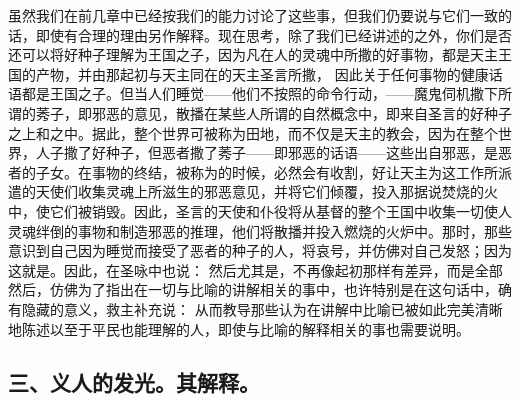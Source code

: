  虽然我们在前几章中已经按我们的能力讨论了这些事，但我们仍要说与它们一致的话，即使有合理的理由另作解释。现在思考，除了我们已经讲述的之外，你们是否还可以将好种子理解为王国之子，因为凡在人的灵魂中所撒的好事物，都是天主王国的产物，并由那起初与天主同在的天主圣言所撒， 因此关于任何事物的健康话语都是王国之子。但当人们睡觉——他们不按照的命令行动，——魔鬼伺机撒下所谓的莠子，即邪恶的意见，散播在某些人所谓的自然概念中，即来自圣言的好种子之上和之中。据此，整个世界可被称为田地，而不仅是天主的教会，因为在整个世界，人子撒了好种子，但恶者撒了莠子——即邪恶的话语——这些出自邪恶，是恶者的子女。在事物的终结，被称为的时候，必然会有收割，好让天主为这工作所派遣的天使们收集灵魂上所滋生的邪恶意见，并将它们倾覆，投入那据说焚烧的火中，使它们被销毁。因此，圣言的天使和仆役将从基督的整个王国中收集一切使人灵魂绊倒的事物和制造邪恶的推理，他们将散播并投入燃烧的火炉中。那时，那些意识到自己因为睡觉而接受了恶者的种子的人，将哀号，并仿佛对自己发怒；因为这就是。因此，在圣咏中也说： 然后尤其是，不再像起初那样有差异，而是全部 然后，仿佛为了指出在一切与比喻的讲解相关的事中，也许特别是在这句话中，确有隐藏的意义，救主补充说： 从而教导那些认为在讲解中比喻已被如此完美清晰地陈述以至于平民也能理解的人，即使与比喻的解释相关的事也需要说明。\par


\subsection{三、义人的发光。其解释。}

